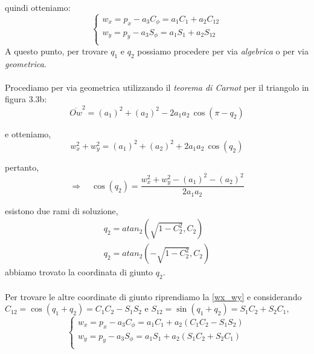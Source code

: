 quindi otteniamo:
\begin{equation} \label{wx_wy}
	\begin{cases}
		w_x = p_x - a_3C_{\phi} = a_1C_1 + a_2C_{12} \\
		w_y = p_y - a_3S_{\phi} = a_1S_1 + a_2S_{12} \\
	\end{cases}
\end{equation}
A questo punto, per trovare $q_1$ e $q_2$ possiamo procedere per via \emph{algebrica} o per via \emph{geometrica}.

\paragraph{}
Procediamo per via geometrica utilizzando il \emph{teorema di Carnot} per il triangolo in figura 3.3b:
\begin{equation}
	\overline{Ow}^2 = (a_1)^2 + (a_2)^2 - 2a_1a_2\,\cos(\pi - q_2)
\end{equation}

e otteniamo,
\begin{equation*}
	w_x^2 + w_y^2 = (a_1)^2 + (a_2)^2 + 2a_1a_2\,\cos(q_2)
\end{equation*}

pertanto,
\begin{equation*}
	\Rightarrow \quad 
	\cos(q_2) = \dfrac{w_x^2 + w_y^2 - (a_1)^2 - (a_2)^2}{2a_1a_2}
\end{equation*}

esistono due rami di soluzione,
\begin{align}
	q_2 = atan_2(\sqrt{1-C_2^2}, C_2) \\
	q_2 = atan_2(-\sqrt{1-C_2^2}, C_2)
\end{align}
abbiamo trovato la coordinata di giunto $q_2$.

\paragraph{}
Per trovare le altre coordinate di giunto riprendiamo la \eqref{wx_wy} e considerando $C_{12} = \cos(q_1 + q_2) = C_1C_2 - S_1S_2$ e $S_{12} = \sin(q_1 + q_2) = S_1C_2 + S_2C_1$,
\begin{equation}
	\begin{cases}
		w_x = p_x - a_3C_{\phi} = a_1C_1 + a_2(C_1C_2 - S_1S_2) \\
		w_y = p_y - a_3S_{\phi} = a_1S_1 + a_2(S_1C_2 + S_2C_1) \\
	\end{cases}
\end{equation}

